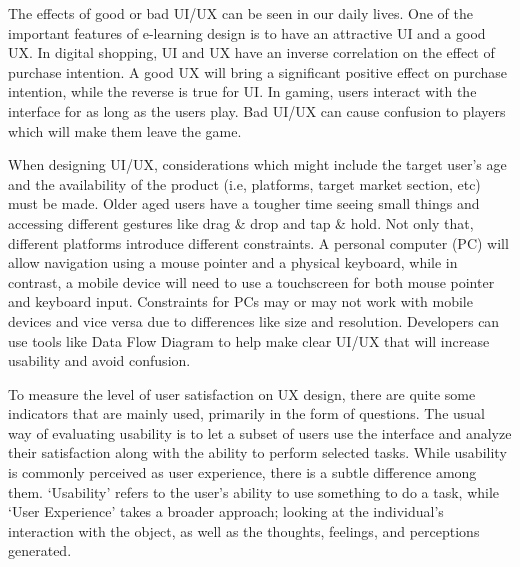 \documentclass[conference]{IEEEtran}
\begin{document}
The effects of good or bad UI/UX can be seen in our daily lives. One of the important features of e-learning design is to have an attractive UI and a good UX\cite{Handayani2020GamifiedLP}. In digital shopping, UI and UX have an inverse correlation on the effect of purchase intention\cite{Watulingas}. A good UX will bring a significant positive effect on purchase intention, while the reverse is true for UI\cite{Watulingas}. In gaming, users interact with the interface for as long as the users play. Bad UI/UX can cause confusion to players which will make them leave the game\cite{Kurniawan2021UIUXMG}.

When designing UI/UX, considerations which might include the target user's age and the availability of the product (i.e, platforms, target market section, etc) must be made. Older aged users have a tougher time seeing small things and accessing different gestures like drag \& drop and tap \& hold\cite{Salman2018UsabilityEO}. Not only that, different platforms introduce different constraints. A personal computer (PC) will allow navigation using a mouse pointer and a physical keyboard, while in contrast, a mobile device will need to use a touchscreen for both mouse pointer and keyboard input. Constraints for PCs may or may not work with mobile devices and vice versa due to differences like size and resolution\cite{Garca2017ValidationON}. Developers can use tools like Data Flow Diagram to help make clear UI/UX that will increase usability and avoid confusion\cite{Wulandari2017DesignDF}.

To measure the level of user satisfaction on UX design, there are quite some indicators that are mainly used, primarily in the form of questions. The usual way of evaluating usability is to let a subset of users use the interface and analyze their satisfaction along with the ability to perform selected tasks\cite{Pastushenko}. While usability is commonly perceived as user experience, there is a subtle difference among them. `Usability' refers to the user's ability to use something to do a task, while `User Experience' takes a broader approach; looking at the individual's interaction with the object, as well as the thoughts, feelings, and perceptions generated\cite{Erlinda}.
\end{document}
